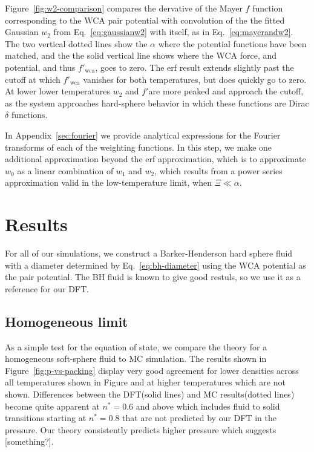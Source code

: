 \documentclass[letterpaper,twocolumn,amsmath,amssymb,prb]{revtex4-1}
\newcommand{\red}[1]{{\color{red} #1}}
\newcommand{\fixme}[1]{\red{[#1]}}
\begin{document}
Figure~\ref{fig:w2-comparison} compares the dervative of the Mayer $f$
function corresponding to the WCA pair potential with convolution of
the the fitted Gaussian $w_2$ from Eq.~\ref{eq:gaussianw2} with
itself, as in Eq.~\ref{eq:mayerandw2}.  The two vertical dotted lines
show the $\alpha$ where the potential functions have been matched, and
the the solid vertical line shows where the WCA force, and potential,
and thus $f'_{\mathrm{wca}}$, goes to zero. The erf result extends
slightly past the cutoff at which $f'_{\mathrm{wca}}$ vanishes for
both temperatures, but does quickly go to zero. At lower lower
temperatures $w_2$ and $f'$are more peaked and approach the cutoff, as
the system approaches hard-sphere behavior in which these functions
are Dirac $\delta$ functions.

In Appendix~\ref{sec:fourier} we provide analytical expressions for
the Fourier transforms of each of the weighting functions.  In this
step, we make one additional approximation beyond the erf
approximation, which is to approximate $w_0$ as a linear combination
of $w_1$ and $w_2$, which results from a power series approximation
valid in the low-temperature limit, when $\Xi\ll\alpha$.

\section{Results}

For all of our simulations, we construct a Barker-Henderson hard
sphere fluid with a diameter determined by Eq.~\ref{eq:bh-diameter}
using the WCA potential as the pair potential. The BH fluid is known
to give good restuls, so we use it as a reference for our DFT.

\subsection{Homogeneous limit}

As a simple test for the equation of state, we compare the theory for
a homogeneous soft-sphere fluid to MC simulation. The results
shown in Figure~\ref{fig:p-vs-packing} display very good agreement for
lower densities across all temperatures shown in Figure and at higher
temperatures which are not shown. Differences between the DFT(solid
lines) and MC results(dotted lines) become quite apparent at $n^*=0.6$
and above which includes fluid to solid transitions starting at
$n^*=0.8$ that are not predicted by our DFT in the pressure. Our
theory consistently predicts higher pressure which suggests
\fixme{something?}.
\end{document}
